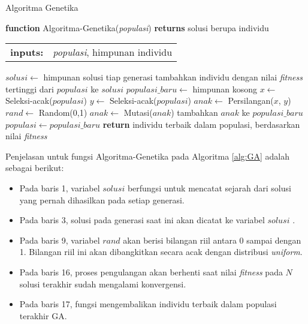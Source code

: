 \begin{algorithm}[!h]
	\caption{Algoritma Genetika \cite{russell2016artificial}}
	\label{alg:GA}
	\begin{flushleft}
		\textbf{function} Algoritma-Genetika(\textit{populasi}) \textbf{returns} solusi berupa individu
		\begin{flushleft}
			\begin{tabular}{ l l }
  				\textbf{inputs:} & \textit{populasi}, himpunan individu
			\end{tabular}
			\hspace{5pt}  
		\end{flushleft}
	\end{flushleft}
	\begin{algorithmic}[1]
		\STATE $solusi \leftarrow$ himpunan solusi tiap generasi
		\REPEAT
			\STATE tambahkan individu dengan nilai \textit{fitness} tertinggi dari $populasi$ ke $solusi$
			\STATE $populasi\_baru \leftarrow$ himpunan kosong %
				\STATE $x \leftarrow$ Seleksi-acak($populasi$)
				\STATE $y \leftarrow$ Seleksi-acak($populasi$)
				\STATE $anak \leftarrow$ Persilangan($x$, $y$)
				\STATE $rand \leftarrow$ Random(0,1)
					\STATE $anak \leftarrow$ Mutasi($anak$)
				\ENDIF
				\STATE tambahkan $anak$ ke $populasi\_baru$
			\ENDFOR
			\STATE $populasi \leftarrow populasi\_baru$
		\STATE \textbf{return} individu terbaik dalam populasi, berdasarkan nilai \textit{fitness}
	\end{algorithmic}
\end{algorithm}

Penjelasan untuk fungsi  Algoritma-Genetika pada Algoritma \ref{alg:GA} adalah sebagai berikut:
\begin{itemize}
	\item Pada baris 1, variabel $solusi$ berfungsi untuk mencatat sejarah dari solusi yang pernah dihasilkan pada setiap generasi.
	\item Pada baris 3, solusi pada generasi saat ini akan dicatat ke variabel $solusi$ .
	\item Pada baris 9, variabel $rand$ akan berisi bilangan riil antara 0 sampai dengan 1. Bilangan riil ini akan dibangkitkan secara acak dengan distribusi \textit{uniform}.
	\item Pada baris 16, proses pengulangan akan berhenti saat nilai \textit{fitness} pada $N$ solusi terakhir sudah mengalami konvergensi.
	\item Pada baris 17, fungsi mengembalikan individu terbaik dalam populasi terakhir GA.
\end{itemize}

